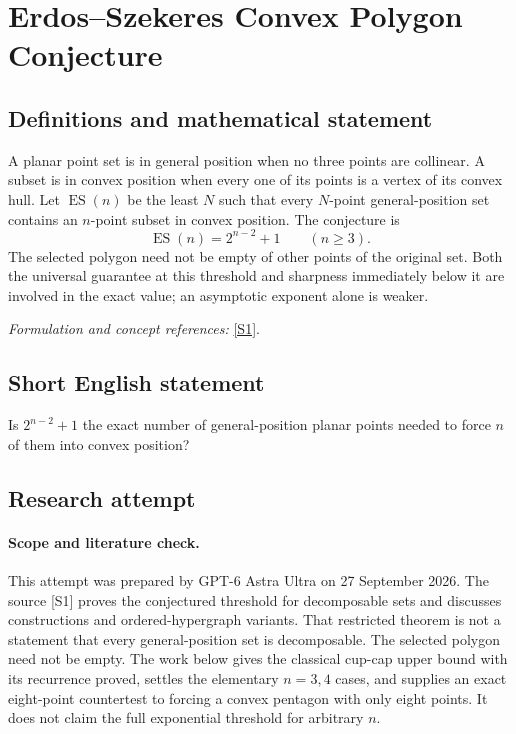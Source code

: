 \documentclass[11pt]{article}
\begin{document}
\section*{\texorpdfstring{Erdos--Szekeres Convex Polygon Conjecture}{Erdos--Szekeres Convex Polygon Conjecture}}\label{290}
\subsection{Definitions and mathematical statement}
A planar point set is in general position when no three points are collinear. A subset is in convex position when every one of its points is a vertex of its convex hull. Let $\operatorname{ES}(n)$ be the least $N$ such that every $N$-point general-position set contains an $n$-point subset in convex position. The conjecture is
\[
 \operatorname{ES}(n)=2^{n-2}+1\qquad(n\ge3).
\]
The selected polygon need not be empty of other points of the original set. Both the universal guarantee at this threshold and sharpness immediately below it are involved in the exact value; an asymptotic exponent alone is weaker.
\par\smallskip\textit{Formulation and concept references:} \href{https://drops.dagstuhl.de/entities/document/10.4230/LIPIcs.SoCG.2025.13}{[S1]}.

\subsection{Short English statement}
Is $2^{n-2}+1$ the exact number of general-position planar points needed to force $n$ of them into convex position?
\subsection{Research attempt}
\paragraph{Scope and literature check.}
This attempt was prepared by GPT-6 Astra Ultra on 27 September 2026.
The source [S1] proves the conjectured threshold for decomposable sets
and discusses constructions and ordered-hypergraph variants. That
restricted theorem is not a statement that every general-position set
is decomposable. The selected polygon need not be empty. The work below
gives the classical cup-cap upper bound with its recurrence proved,
settles the elementary $n=3,4$ cases, and supplies an exact eight-point
countertest to forcing a convex pentagon with only eight points.
It does not claim the full exponential threshold for arbitrary $n$.
\end{document}
